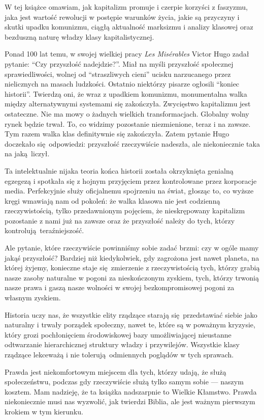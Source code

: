 \documentclass[12pt]{book}
\begin{document}
W tej książce omawiam, jak kapitalizm promuje i czerpie korzyści z faszyzmu, jaka jest wartość rewolucji w postępie warunków życia, jakie są przyczyny i skutki upadku komunizmu, ciągłą aktualność marksizmu i analizy klasowej oraz bezduszną naturę władzy klasy kapitalistycznej.

Ponad 100 lat temu, w swojej wielkiej pracy \emph{Les Misérables} Victor Hugo zadał pytanie: ``Czy przyszłość nadejdzie?''. Miał na myśli przyszłość społecznej sprawiedliwości, wolnej od ``straszliwych cieni'' ucisku narzucanego przez nielicznych na masach ludzkości. Ostatnio niektórzy pisarze ogłosili ``koniec historii''. Twierdzą oni, że wraz z upadkiem komunizmu, monumentalna walka między alternatywnymi systemami się zakończyła. Zwycięstwo kapitalizmu jest ostateczne. Nie ma mowy o żadnych wielkich transformacjach. Globalny wolny rynek będzie trwał. To, co widzimy pozostanie niezmienione, teraz i na zawsze. Tym razem walka klas definitywnie się zakończyła. Zatem pytanie Hugo doczekało się odpowiedzi: przyszłość rzeczywiście nadeszła, ale niekoniecznie taka na jaką liczył.

Ta intelektualnie nijaka teoria końca historii została okrzyknięta genialną egzegezą i spotkała się z hojnym przyjęciem przez kontrolowane przez korporacje media. Perfekcyjnie służy oficjalnemu spojrzeniu na świat, głosząc to, co wyższe kręgi wmawiają nam od pokoleń: że walka klasowa nie jest codzienną rzeczywistością, tylko przedawnionym pojęciem, że nieskrępowany kapitalizm pozostanie z nami już na zawsze oraz że przyszłość należy do tych, którzy kontrolują teraźniejszość.

Ale pytanie, które rzeczywiście powinniśmy sobie zadać brzmi: czy w ogóle mamy jakąś przyszłość? Bardziej niż kiedykolwiek, gdy zagrożona jest nawet planeta, na której żyjemy, konieczne staje się zmierzenie z rzeczywistością tych, którzy grabią nasze zasoby naturalne w pogoni za nieskończonym zyskiem, tych, którzy trwonią nasze prawa i gaszą nasze wolności w swojej bezkompromisowej pogoni za własnym zyskiem.

Historia uczy nas, że wszystkie elity rządzące starają się przedstawiać siebie jako naturalny i trwały porządek społeczny, nawet te, które są w poważnym kryzysie, który grozi pochłonięciem środowiskowej bazy umożliwiającej nieustanne odtwarzanie hierarchicznej struktury władzy i przywilejów. Wszystkie klasy rządzące lekceważą i nie tolerują odmiennych poglądów w tych sprawach.

Prawda jest niekomfortowym miejscem dla tych, którzy udają, że służą społeczeństwu, podczas gdy rzeczywiście służą tylko samym sobie — naszym kosztem. Mam nadzieję, że ta książka nadszarpnie to Wielkie Kłamstwo. Prawda niekoniecznie musi nas wyzwolić, jak twierdzi Biblia, ale jest ważnym pierwszym krokiem w tym kierunku.
\end{document}
